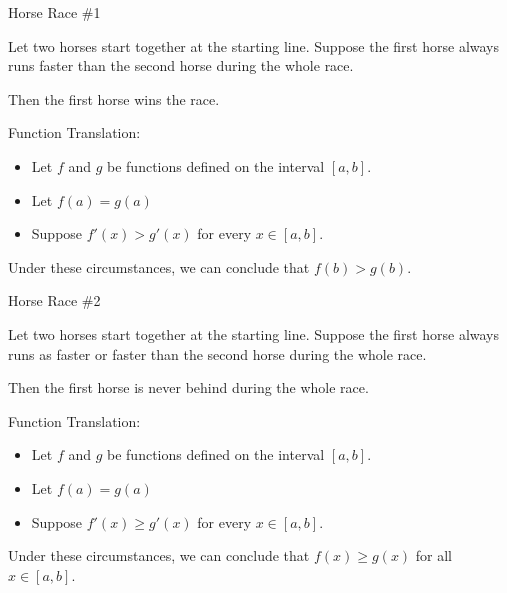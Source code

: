 \documentclass{ximera}
\begin{document}
\begin{idea} Horse Race \#1


Let two horses start together at the starting line. Suppose the first horse always runs faster than the second horse during the whole race.

Then the first horse wins the race.



\begin{model} Function Translation:

\begin{itemize}
\item Let $f$ and $g$ be functions defined on the interval $[a, b]$. 
\item Let $f(a) = g(a)$
\item Suppose $f'(x) > g'(x)$ for every $x \in [a,b]$. 
\end{itemize}

Under these circumstances, we can conclude that $f(b) > g(b)$.

\end{model} 




\end{idea}












\begin{idea} Horse Race \#2


Let two horses start together at the starting line. Suppose the first horse always runs as faster or faster than the second horse during the whole race.

Then the first horse is never behind during the whole race.



\begin{model} Function Translation:

\begin{itemize}
\item Let $f$ and $g$ be functions defined on the interval $[a, b]$. 
\item Let $f(a) = g(a)$
\item Suppose $f'(x) \geq g'(x)$ for every $x \in [a,b]$. 
\end{itemize}

Under these circumstances, we can conclude that $f(x) \geq g(x)$ for all $x \in [a,b]$.

\end{model}

\end{idea}
\end{document}
